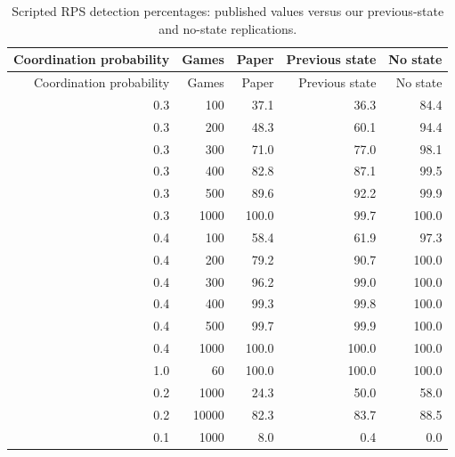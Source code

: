 \begingroup\footnotesize\setlength{\tabcolsep}{3pt}
\begin{longtable}{@{}rrrrr@{}}
\caption{Scripted RPS detection percentages: published values versus our previous-state and no-state replications.}\\
\toprule Coordination probability & Games & Paper & Previous state & No state\\\midrule\endfirsthead
\toprule Coordination probability & Games & Paper & Previous state & No state\\\midrule\endhead
\bottomrule\endfoot
0.3 & 100 & 37.1 & 36.3 & 84.4\\
0.3 & 200 & 48.3 & 60.1 & 94.4\\
0.3 & 300 & 71.0 & 77.0 & 98.1\\
0.3 & 400 & 82.8 & 87.1 & 99.5\\
0.3 & 500 & 89.6 & 92.2 & 99.9\\
0.3 & 1000 & 100.0 & 99.7 & 100.0\\
0.4 & 100 & 58.4 & 61.9 & 97.3\\
0.4 & 200 & 79.2 & 90.7 & 100.0\\
0.4 & 300 & 96.2 & 99.0 & 100.0\\
0.4 & 400 & 99.3 & 99.8 & 100.0\\
0.4 & 500 & 99.7 & 99.9 & 100.0\\
0.4 & 1000 & 100.0 & 100.0 & 100.0\\
1.0 & 60 & 100.0 & 100.0 & 100.0\\
0.2 & 1000 & 24.3 & 50.0 & 58.0\\
0.2 & 10000 & 82.3 & 83.7 & 88.5\\
0.1 & 1000 & 8.0 & 0.4 & 0.0\\
\end{longtable}\endgroup
\begingroup\footnotesize\setlength{\tabcolsep}{3pt}
